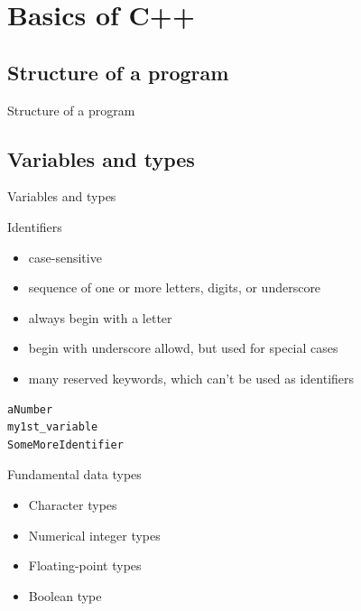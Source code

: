 \documentclass{beamer}
\begin{document}
\section{Basics of C++}

\subsection{Structure of a program}
\begin{frame}{Structure of a program}
\end{frame}

\subsection{Variables and types}
\begin{frame}{Variables and types}
\end{frame}


\begin{frame}[fragile]{Identifiers}
\begin{itemize}
  \item case-sensitive
  \item sequence of one or more letters, digits, or underscore
  \item always begin with a letter
  \item begin with underscore allowd, but used for special cases
  \item many reserved keywords, which can't be used as identifiers 
\end{itemize}
\begin{lstlisting}[caption=Identifiers Examples]
aNumber
my1st_variable
SomeMoreIdentifier
\end{lstlisting}
\end{frame}

\begin{frame}{Fundamental data types}
\begin{itemize}
  \item Character types
  \item Numerical integer types
  \item Floating-point types
  \item Boolean type
\end{itemize}
\end{frame}
\end{document}
